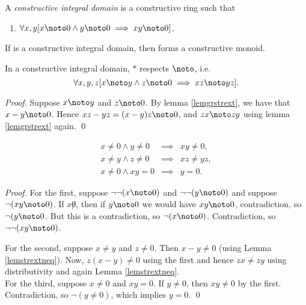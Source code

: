
\begin{definition}\label{defintdom}
  A {\em constructive integral domain\/} is a constructive ring
   such that
\begin{enumerate}
  \item $\forall x,y [x\noto 0 \wedge y\noto 0 \implies x y \noto 0]$.
\end{enumerate}
\end{definition}

\begin{lemma}\label{nonzsetoid}
If  is a constructive integral domain,
then  forms a
constructive monoid.
\end{lemma}

\begin{lemma}\label{intmulrespap}
In a constructive integral domain, $*$ respects $\noto$, i.e.
\[
\forall x,y,z[x\noto y \wedge z\noto 0 \implies x z \noto y z].
\]
\end{lemma}
\begin{proof}
  Suppose $x\noto y$ and $z\noto 0$. By lemma \ref{lemgrstrext}, we
  have that $x-y \noto 0$.  Hence $x z-y z=(x-y)z\noto 0$, and 
  $z x\noto z y$ using lemma \ref{lemgrstrext} again. \qed
\end{proof}


\begin{lemma}\label{lempropid}
\begin{eqnarray*}
x\neq 0 \wedge y\neq 0 &\implies& x y \neq 0,\\
x\neq y \wedge z\neq 0 &\implies& x z \neq y  z,\\
x\neq0 \wedge x y = 0 &\implies & y=0.
\end{eqnarray*}
\end{lemma}

\begin{proof}
For the first, suppose $\neg\neg(x\noto 0)$ and $\neg\neg(y\noto 0)$
and suppose $\neg(x y\noto 0)$. If $x\not 0$, then if $y\noto 0$ we
would have $x y \noto 0$, contradiction, so $\neg(y\noto 0$. But this
is a contradiction, so $\neg(x\noto 0)$. Contradiction, so 
$\neg\neg(x y\noto 0)$.

For the second, suppose $x\neq y$ and $z\neq 0$. Then $x-y \neq 0$
(using Lemma \ref{lemstrextneq}). Now, $z (x-y) \neq 0$ using the
first and hence $z x \neq z y$ using distributivity and again Lemma
\ref{lemstrextneq}.\\ For the third, suppose $x\neq 0$ and $x y=0$. If
$y\neq 0$, then $x y \neq 0$ by the first. Contradiction, so
$\neg(y\neq 0)$, which implies $y=0$. \qed
\end{proof}

